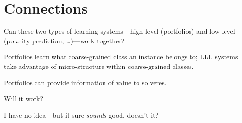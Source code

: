 \section{Connections}

\begin{frame}
Can these two types of learning systems---high-level (portfolios) and low-level
(polarity prediction, \dots)---work together?
\end{frame}

\begin{frame}
Portfolios learn what coarse-grained class an instance belongs to; LLL systems
take advantage of micro-structure within coarse-grained classes.
\end{frame}

\begin{frame}
\end{frame}

\begin{frame}
Portfolios can provide information of value to solveres.
\end{frame}

\begin{frame}
\end{frame}

\begin{frame}
Will it work?
\end{frame}

\begin{frame}
I have no idea---but it sure \emph{sounds} good, doesn't it?
\end{frame}

